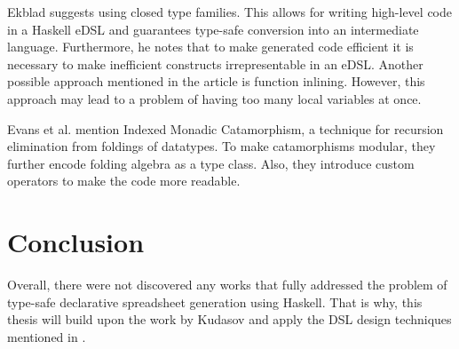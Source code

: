 Ekblad \cite{ekblad_high-performance_2016} suggests using closed type families. This allows for writing high-level code in a Haskell eDSL and guarantees type-safe conversion into an intermediate language. Furthermore, he notes that to make generated code efficient it is necessary to make inefficient constructs irrepresentable in an eDSL. Another possible approach mentioned in the article is function inlining. However, this approach may lead to a problem of having too many local variables at once.

Evans et al.\cite{evans_circuitflow_2021} mention Indexed Monadic Catamorphism, a technique for recursion elimination from foldings of datatypes. To make catamorphisms modular, they further encode folding algebra as a type class. Also, they introduce custom operators to make the code more readable.

\section{Conclusion}

Overall, there were not discovered any works that fully addressed the problem of type-safe declarative spreadsheet generation using Haskell. That is why, this thesis will build upon the work by Kudasov \cite{youtube_kudasov} and apply the DSL design techniques mentioned in .